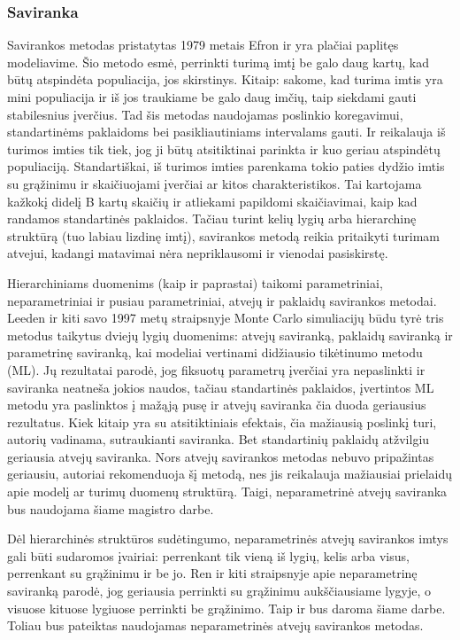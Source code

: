 \documentclass[12pt,a4paper]{article}
\begin{document}
\subsubsection{Saviranka}

\indent Savirankos metodas pristatytas 1979 metais Efron \cite{efron} ir yra plačiai paplitęs modeliavime. Šio metodo esmė, perrinkti turimą imtį be galo daug kartų, kad būtų atspindėta populiacija, jos skirstinys. Kitaip: sakome, kad turima imtis yra mini populiacija ir iš jos traukiame be galo daug imčių, taip siekdami gauti stabilesnius įverčius. Tad šis metodas naudojamas poslinkio koregavimui, standartinėms paklaidoms bei pasikliautiniams intervalams gauti. Ir reikalauja iš turimos imties tik tiek, jog ji būtų atsitiktinai parinkta ir kuo geriau atspindėtų populiaciją. Standartiškai, iš turimos imties parenkama tokio paties dydžio imtis su grąžinimu ir skaičiuojami įverčiai ar kitos charakteristikos. Tai kartojama kažkokį didelį B kartų skaičių ir atliekami papildomi skaičiavimai, kaip kad randamos standartinės paklaidos. Tačiau turint kelių lygių arba hierarchinę struktūrą (tuo labiau lizdinę imtį), savirankos metodą reikia pritaikyti turimam atvejui, kadangi matavimai nėra nepriklausomi ir vienodai pasiskirstę.

\indent Hierarchiniams duomenims (kaip ir paprastai) taikomi parametriniai, neparametriniai ir pusiau parametriniai, atvejų ir paklaidų savirankos metodai. Leeden ir kiti \cite{bootML} savo 1997 metų straipsnyje Monte Carlo simuliacijų būdu tyrė tris metodus taikytus dviejų lygių duomenims: atvejų saviranką, paklaidų saviranką ir parametrinę saviranką, kai modeliai vertinami didžiausio tikėtinumo metodu (ML). Jų rezultatai parodė, jog fiksuotų parametrų įverčiai yra nepaslinkti ir saviranka neatneša jokios naudos, tačiau standartinės paklaidos, įvertintos ML metodu yra paslinktos į mažąją pusę ir atvejų saviranka čia duoda geriausius rezultatus. Kiek kitaip yra su atsitiktiniais efektais, čia mažiausią poslinkį turi, autorių vadinama, sutraukianti saviranka. Bet standartinių paklaidų atžvilgiu geriausia atvejų saviranka. Nors atvejų savirankos metodas nebuvo pripažintas geriausiu, autoriai rekomenduoja šį metodą, nes jis reikalauja mažiausiai prielaidų apie modelį ar turimų duomenų struktūrą. Taigi, neparametrinė atvejų saviranka bus naudojama šiame magistro darbe.

\indent Dėl hierarchinės struktūros sudėtingumo, neparametrinės atvejų savirankos imtys gali būti sudaromos įvairiai: perrenkant tik vieną iš lygių, kelis arba visus, perrenkant su grąžinimu ir be jo. Ren ir kiti \cite{bootNest} straipsnyje apie neparametrinę saviranką parodė, jog geriausia perrinkti su grąžinimu aukščiausiame lygyje, o visuose kituose lygiuose perrinkti be grąžinimo. Taip ir bus daroma šiame darbe. Toliau bus pateiktas naudojamas neparametrinės atvejų savirankos metodas.
\end{document}
